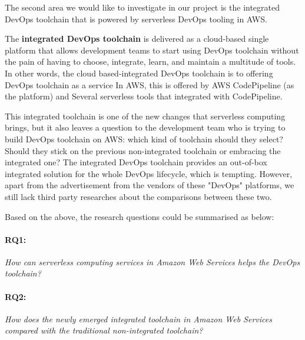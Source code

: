 \par
The second area we would like to investigate in our project is the integrated DevOps toolchain that is powered by serverless DevOps tooling in AWS. 
\par
The \textbf{integrated DevOps toolchain} is delivered as a cloud-based single platform that allows development teams to start using DevOps toolchain without the pain of having to choose, integrate, learn, and maintain a multitude of tools. In other words, the cloud based-integrated DevOps toolchain is to offering DevOps toolchain as a service
In AWS, this is offered by AWS CodePipeline (as the platform) and Several serverless tools that integrated with CodePipeline.
\par
This integrated toolchain is one of the new changes that serverless computing brings, but it also leaves a question to the development team who is trying to build DevOps toolchain on AWS: which kind of toolchain should they select? Should they stick on the previous non-integrated toolchain or embracing the integrated one? The integrated DevOps toolchain provides an out-of-box integrated solution for the whole DevOps lifecycle, which is tempting. However, apart from the advertisement from the vendors of these "DevOps" platforms, we still lack third party researches about the comparisons between these two. 
\par
Based on the above, the research questions could be summarised as below:
\paragraph{RQ1:} \textit{How can serverless computing services in Amazon Web Services helps the DevOps toolchain?}
\paragraph{RQ2:} \textit{How does the newly emerged integrated toolchain in Amazon Web Services compared with the traditional non-integrated toolchain?}
